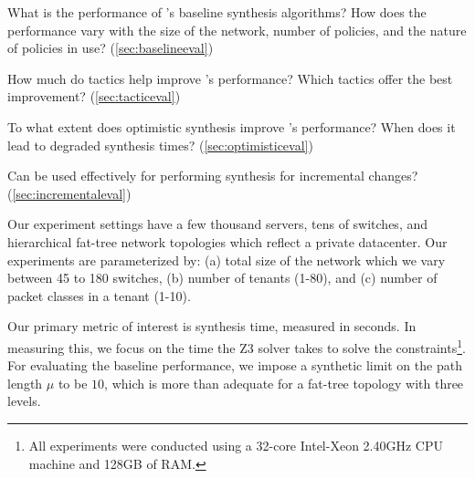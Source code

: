 \begin{compactitemize}

\item What is the performance of \Name's baseline synthesis
  algorithms? How does the performance vary with the size of the
  network, number of policies, and the nature of policies in use? (\cref{sec:baselineeval})

\item How much do tactics help improve \Name's 
  performance? Which tactics offer the best improvement? (\cref{sec:tacticeval})

\item To what extent does optimistic synthesis improve \Name's
  performance? When does it lead to degraded synthesis times? (\cref{sec:optimisticeval})

\item Can \Name be used effectively for performing synthesis for
incremental changes?  (\cref{sec:incrementaleval})

\end{compactitemize}
Our experiment settings have a few thousand servers, tens of switches,
and hierarchical fat-tree network topologies which reflect a private
datacenter. Our experiments are parameterized by: (a) total size of
the network which we vary between 45 to 180 switches, (b) number of
tenants (1-80), and (c) number of packet classes in a tenant (1-10).

Our primary metric of interest is synthesis time, measured in
seconds. In measuring this, we focus on the time the Z3 solver takes
to solve the constraints\footnote{All experiments were conducted using a
	32-core Intel-Xeon 2.40GHz CPU machine and
	128GB of RAM.}. For evaluating the baseline performance, we impose a
synthetic limit on the path length $\mu$ to be $10$, which is more than adequate 
for a fat-tree topology with three levels. 

